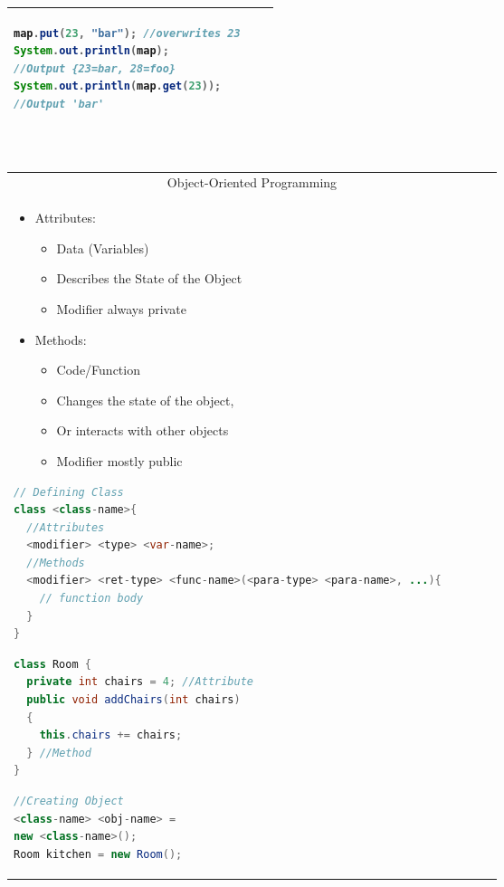 \documentclass[a4paper, 8pt]{extarticle}
\begin{document}
\begin{minipage}[t]{0.25\linewidth}
\begin{tabular}{|p{0.9\linewidth}|}
\begin{lstlisting}[language=Java, aboveskip=-2pt,belowskip=-6pt]
map.put(23, "bar"); //overwrites 23
System.out.println(map); 
//Output {23=bar, 28=foo} 
System.out.println(map.get(23)); 
//Output 'bar'
\end{lstlisting}
\\\hline
\end{tabular}
\\[3pt]
\end{minipage}\begin{minipage}[t]{0.25\linewidth}\vspace{0pt}\begin{tabular}{|p{0.9\linewidth}|}
\multicolumn{1}{|c|}{\cellcolor{headcol}\color{white}Object-Oriented Programming}\\
\vspace{-11pt}
\fontsize{8}{5}\selectfont
\begin{itemize}
\setlength{\itemindent}{-15pt}
\small
\item[] Attributes: 
\vspace{-5pt}
\begin{itemize}
\small
\setlength{\itemindent}{-15pt}
\setlength{\itemindent}{-37pt}\item[] Data (Variables)
\item[] Describes the State of the Object
\item[] Modifier always private
\end{itemize}
\item[] Methods: 
\vspace{-5pt}
\begin{itemize}
\small
\setlength{\itemindent}{-37pt}\item[] Code/Function
\item[] Changes the state of the object, 
\item[] Or interacts with other objects
\item[] Modifier mostly public
\end{itemize}
\end{itemize}
\begin{lstlisting}[language=Java, aboveskip=-2pt,belowskip=0pt]
// Defining Class
class <class-name>{
  //Attributes
  <modifier> <type> <var-name>;
  //Methods
  <modifier> <ret-type> <func-name>(<para-type> <para-name>, ...){
    // function body
  }
}
\end{lstlisting}
\begin{lstlisting}[language=Java, aboveskip=0pt,belowskip=0pt]
class Room {
  private int chairs = 4; //Attribute
  public void addChairs(int chairs)
  {
    this.chairs += chairs;
  } //Method
}\end{lstlisting}
\vspace{5pt}
\begin{lstlisting}[language=Java, aboveskip=0pt,belowskip=-6pt]
//Creating Object
<class-name> <obj-name> = 
new <class-name>();
Room kitchen = new Room();


\end{lstlisting}
\end{tabular}
\end{minipage}
\end{document}
